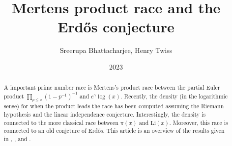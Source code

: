 \documentclass[12pt,reqno]{amsart}
\theoremstyle{definition}
\numberwithin{equation}{section}
\begin{document}
\begin{abstract}
    A important prime number race is Mertens's product race between the partial Euler product $\prod_{p \le x}(1-p^{-1})^{-1}$ and $e^{\gamma}\log(x)$. Recently, the density (in the logarithmic sense) for when the product leads the race has been computed assuming the Riemann hypothesis and the linear independence conjecture. Interestingly, the density is connected to the more classical race between $\pi(x)$ and $\mathrm{Li}(x)$. Moreover, this race is connected to an old conjcture of Erd\H{o}s. This article is an overview of the results given in \cite{Li}, \cite{La}, and \cite{LMP}.
\end{abstract}

\title{Merten\textquotesingle s product race and the Erd\H{o}s conjecture}
\author{Sreerupa Bhattacharjee, Henry Twiss}
\date{2023}
\maketitle
\thispagestyle{empty}
\end{document}
